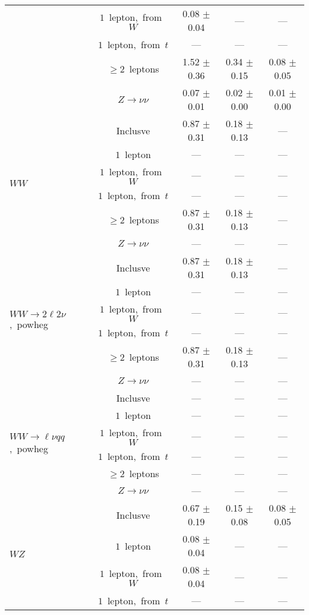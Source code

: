 \documentclass{article}
\begin{document}
\begin{longtable}{|l|c|c|c|c|}
 & $1$~lepton,~from~$W$  & 0.08 $\pm$ 0.04  & ---  & --- \\* 
 & $1$~lepton,~from~$t$  & ---  & ---  & --- \\* 
 & $\ge2$~leptons  & 1.52 $\pm$ 0.36  & 0.34 $\pm$ 0.15  & 0.08 $\pm$ 0.05 \\* 
 & $Z\rightarrow\nu\nu$  & 0.07 $\pm$ 0.01  & 0.02 $\pm$ 0.00  & 0.01 $\pm$ 0.00 \\* 
\hline 
\multirow{6}{*}{$WW$} & Inclusve  & 0.87 $\pm$ 0.31  & 0.18 $\pm$ 0.13  & --- \\* 
 & $1$~lepton  & ---  & ---  & --- \\* 
 & $1$~lepton,~from~$W$  & ---  & ---  & --- \\* 
 & $1$~lepton,~from~$t$  & ---  & ---  & --- \\* 
 & $\ge2$~leptons  & 0.87 $\pm$ 0.31  & 0.18 $\pm$ 0.13  & --- \\* 
 & $Z\rightarrow\nu\nu$  & ---  & ---  & --- \\* 
\hline 
\multirow{6}{*}{$WW{\rightarrow}2\ell2\nu$,~powheg} & Inclusve  & 0.87 $\pm$ 0.31  & 0.18 $\pm$ 0.13  & --- \\* 
 & $1$~lepton  & ---  & ---  & --- \\* 
 & $1$~lepton,~from~$W$  & ---  & ---  & --- \\* 
 & $1$~lepton,~from~$t$  & ---  & ---  & --- \\* 
 & $\ge2$~leptons  & 0.87 $\pm$ 0.31  & 0.18 $\pm$ 0.13  & --- \\* 
 & $Z\rightarrow\nu\nu$  & ---  & ---  & --- \\* 
\hline 
\multirow{6}{*}{$WW{\rightarrow}{\ell}{\nu}qq$,~powheg} & Inclusve  & ---  & ---  & --- \\* 
 & $1$~lepton  & ---  & ---  & --- \\* 
 & $1$~lepton,~from~$W$  & ---  & ---  & --- \\* 
 & $1$~lepton,~from~$t$  & ---  & ---  & --- \\* 
 & $\ge2$~leptons  & ---  & ---  & --- \\* 
 & $Z\rightarrow\nu\nu$  & ---  & ---  & --- \\* 
\hline 
\multirow{6}{*}{$WZ$} & Inclusve  & 0.67 $\pm$ 0.19  & 0.15 $\pm$ 0.08  & 0.08 $\pm$ 0.05 \\* 
 & $1$~lepton  & 0.08 $\pm$ 0.04  & ---  & --- \\* 
 & $1$~lepton,~from~$W$  & 0.08 $\pm$ 0.04  & ---  & --- \\* 
 & $1$~lepton,~from~$t$  & ---  & ---  & --- \\* 

\end{longtable}
\end{document}
